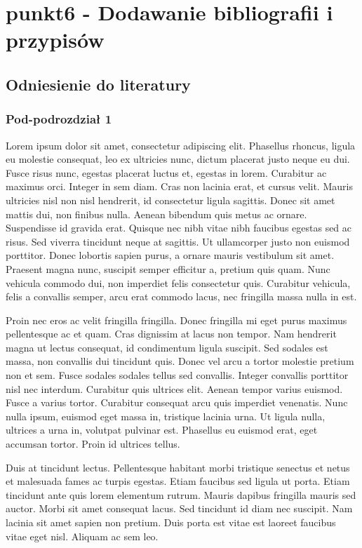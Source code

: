 \chapter{punkt6 - Dodawanie bibliografii i przypisów}
\section{Odniesienie do literatury}
\subsection*{Pod-podrozdział 1}
Lorem ipsum dolor sit amet, consectetur adipiscing elit. Phasellus rhoncus, ligula eu molestie consequat, leo ex ultricies nunc, dictum placerat justo neque eu dui. Fusce risus nunc, egestas placerat luctus et, egestas in lorem. Curabitur ac maximus orci. Integer in sem diam. Cras non lacinia erat, et cursus velit. Mauris ultricies nisl non nisl hendrerit, id consectetur ligula sagittis. Donec sit amet mattis dui, non finibus nulla. Aenean bibendum quis metus ac ornare. Suspendisse id gravida erat. Quisque nec nibh vitae nibh faucibus egestas sed ac risus. Sed viverra tincidunt neque at sagittis. Ut ullamcorper justo non euismod porttitor. Donec lobortis sapien purus, a ornare mauris vestibulum sit amet. Praesent magna nunc, suscipit semper efficitur a, pretium quis quam. Nunc vehicula commodo dui, non imperdiet felis consectetur quis. Curabitur vehicula, felis a convallis semper, arcu erat commodo lacus, nec fringilla massa nulla in est.

Proin nec eros ac velit fringilla fringilla. Donec fringilla mi eget purus maximus pellentesque ac et quam. Cras dignissim at lacus non tempor. Nam hendrerit magna ut lectus consequat, id condimentum ligula suscipit. Sed sodales est massa, non convallis dui tincidunt quis. Donec vel arcu a tortor molestie pretium non et sem. Fusce sodales sodales tellus sed convallis. Integer convallis porttitor nisl nec interdum. Curabitur quis ultrices elit. Aenean tempor varius euismod. Fusce a varius tortor. Curabitur consequat arcu quis imperdiet venenatis. Nunc nulla ipsum, euismod eget massa in, tristique lacinia urna. Ut ligula nulla, ultrices a urna in, volutpat pulvinar est. Phasellus eu euismod erat, eget accumsan tortor. Proin id ultrices tellus.

Duis at tincidunt lectus. Pellentesque habitant morbi tristique senectus et netus et malesuada fames ac turpis egestas. Etiam faucibus sed ligula ut porta. Etiam tincidunt ante quis lorem elementum rutrum. Mauris dapibus fringilla mauris sed auctor. Morbi sit amet consequat lacus. Sed tincidunt id diam nec suscipit. Nam lacinia sit amet sapien non pretium. Duis porta est vitae est laoreet faucibus vitae eget nisl. Aliquam ac sem leo.

